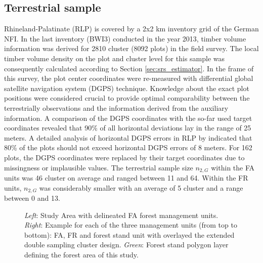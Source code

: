 


\subsection{Terrestrial sample}

Rhineland-Palatinate (RLP) is covered by a 2x2 km inventory grid of the German NFI. In the last inventory (BWI3) conducted in the year 2013, timber volume information was derived for 2810 cluster (8092 plots) in the field survey. The local timber volume density on the plot and cluster level for this sample was consequently calculated according to Section \ref{sec:srs_estimator}. In the frame of this survey, the plot center coordinates were re-measured with differential global satellite navigation system (DGPS) technique. Knowledge about the exact plot positions were considered crucial to provide optimal comparability between the terrestrially observations and the information derived from the auxiliary information. A comparison of the DGPS coordinates with the so-far used target coordinates revealed that 90\% of all horizontal deviations lay in the range of 25 meters. A detailed analysis of horizontal DGPS errors in RLP by \citet{lambrecht2017} indicated that 80\% of the plots should not exceed horizontal DGPS errors of 8 meters. For 162 plots, the DGPS coordinates were replaced by their target coordinates due to missingness or implausible values. The terrestrial sample size $n_{2,G}$ within the FA units was 46 cluster on average and ranged between 11 and 64. Within the FR units, $n_{2,G}$ was considerably smaller with an average of 5 cluster and a range between 0 and 13.

\begin{figure}[H]
	\centering
	\caption{\textit{Left}: Study Area with delineated FA forest management units. \textit{Right}: Example for each of the three management units (from top to bottom): FA, FR and forest stand unit with overlayed the extended double sampling cluster design. \textit{Green}: Forest stand polygon layer defining the forest area of this study.}
	\label{fig:StudyArea}
\end{figure}

